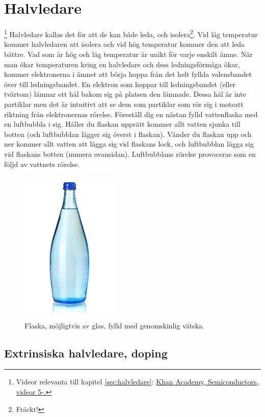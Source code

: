 \section{Halvledare} 

\footnote{Videor relevanta till kapitel \ref{sec:halvledare}: \href{https://www.youtube.com/playlist?list=PL2ub1_oKCn7ogaMtdB2RumlIYqNeXf_oX}{Khan Academy, Semiconductors, videor 5-.}}
\label{sec:halvledare}
Halvledare kallas det för att de kan både leda, och isolera\footnote{Fräckt!}. Vid låg temperatur kommer halvledaren att isolera och vid hög temperatur kommer den att leda bättre. Vad som är hög och låg temperatur är unikt för varje enskilt ämne. När man ökar temperaturen kring en halvledare och dess ledningsförmåga ökar, kommer elektronerna i ämnet att börja hoppa från det helt fyllda valensbandet över till ledningsbandet. En elektron som hoppar till ledningsbandet (eller tvärtom) lämnar ett hål bakom sig på platsen den lämnade. Dessa hål är inte partiklar men det är intuitivt att se dem som partiklar som rör sig i motsatt riktning från elektronernas rörelse. Föreställ dig en nästan fylld vattenflaska med en luftbubbla i sig. Håller du flaskan upprätt kommer allt vatten sjunka till botten (och luftbubblan lägger sig överst i flaskan). Vänder du flaskan upp och ner kommer allt vatten att lägga sig vid flaskans lock, och luftbubblan lägga sig vid flaskans botten (numera ovansidan). Luftbubblans rörelse provoceras som en följd av vattnets rörelse. 
\begin{figure}[ht]
    \centering
    \includegraphics[scale = 0.3]{bilder/vatten.png}
    \caption{Flaska, möjligtvis av glas, fylld med genomskinlig vätska.}
    \label{fig:vatten}
\end{figure}

\subsection{Extrinsiska halvledare, doping}

